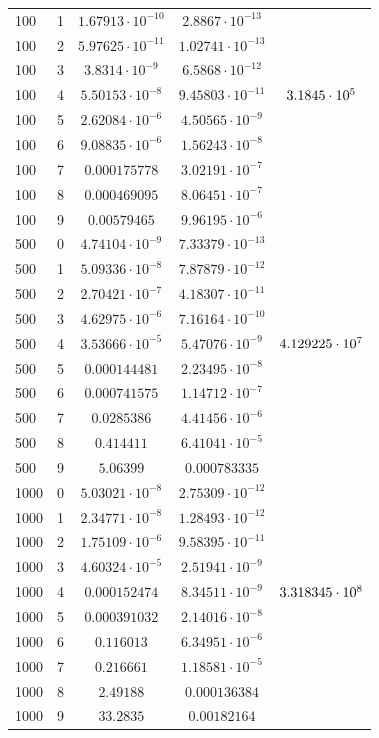 \documentclass[english]{article}
\begin{document}
\begin{center}
\begin{longtable}{l|l|c|c|c}
    100 & 1 & \(1.67913\cdot 10^{-10}\) & \(2.8867\cdot 10^{-13}\) & \\
    100 & 2 & \(5.97625\cdot 10^{-11}\) & \(1.02741\cdot 10^{-13}\) & \\
    100 & 3 & \(3.8314\cdot 10^{-9}\) & \(6.5868\cdot 10^{-12}\) & \\
    100 & 4 & \(5.50153\cdot 10^{-8}\) & \(9.45803\cdot 10^{-11}\) & \(\large 3.1845 \cdot 10^5\) \\
    100 & 5 & \(2.62084\cdot 10^{-6}\) & \(4.50565\cdot 10^{-9}\) & \\
    100 & 6 & \(9.08835\cdot 10^{-6}\) & \(1.56243\cdot 10^{-8}\) & \\
    100 & 7 & \(0.000175778\) & \(3.02191\cdot 10^{-7}\) & \\
    100 & 8 & \(0.000469095\) & \(8.06451\cdot 10^{-7}\) & \\
    100 & 9 & \(0.00579465\) & \(9.96195\cdot 10^{-6}\) & \\
    \hline
    500 & 0 & \(4.74104\cdot 10^{-9}\) & \(7.33379\cdot 10^{-13}\) & \\
    500 & 1 & \(5.09336\cdot 10^{-8}\) & \(7.87879\cdot 10^{-12}\) & \\
    500 & 2 & \(2.70421\cdot 10^{-7}\) & \(4.18307\cdot 10^{-11}\) & \\
    500 & 3 & \(4.62975\cdot 10^{-6}\) & \(7.16164\cdot 10^{-10}\) & \\
    500 & 4 & \(3.53666\cdot 10^{-5}\) & \(5.47076\cdot 10^{-9}\) & \(\large 4.129225 \cdot 10^7 \) \\
    500 & 5 & \(0.000144481\) & \(2.23495\cdot 10^{-8}\) & \\
    500 & 6 & \(0.000741575\) & \(1.14712\cdot 10^{-7}\) & \\
    500 & 7 & \(0.0285386\) & \(4.41456\cdot 10^{-6}\) & \\
    500 & 8 & \(0.414411\) & \(6.41041\cdot 10^{-5}\) & \\
    500 & 9 & \(5.06399\) & \(0.000783335\) & \\
    \hline
    1000 & 0 & \(5.03021\cdot 10^{-8}\) & \(2.75309\cdot 10^{-12}\) & \\
    1000 & 1 & \(2.34771\cdot 10^{-8}\) & \(1.28493\cdot 10^{-12}\) & \\
    1000 & 2 & \(1.75109\cdot 10^{-6}\) & \(9.58395\cdot 10^{-11}\) & \\
    1000 & 3 & \(4.60324\cdot 10^{-5}\) & \(2.51941\cdot 10^{-9}\) & \\
    1000 & 4 & \(0.000152474\) & \(8.34511\cdot 10^{-9}\) & \(\large 3.318345 \cdot 10^8 \) \\
    1000 & 5 & \(0.000391032\) & \(2.14016\cdot 10^{-8}\) & \\
    1000 & 6 & \(0.116013\) & \(6.34951\cdot 10^{-6}\) & \\
    1000 & 7 & \(0.216661\) & \(1.18581\cdot 10^{-5}\) & \\
    1000 & 8 & \(2.49188\) & \(0.000136384\) & \\
    1000 & 9 & \(33.2835\) & \(0.00182164\)
  \end{longtable}
\end{center}
\end{document}
